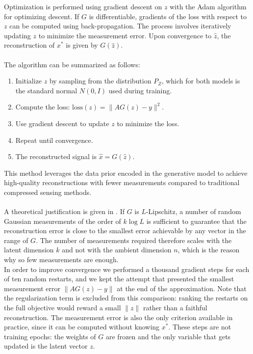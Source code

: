 Optimization is performed using gradient descent on \( z \) with the Adam algorithm \cite{kingma2015adam} for optimizing descent. If \( G \) is differentiable, gradients of the loss with respect to \( z \) can be computed using back-propagation. The process involves iteratively updating \( z \) to minimize the measurement error. Upon convergence to \( \hat{z} \), the reconstruction of \( x^* \) is given by \( G(\hat{z}) \).
\\\\
The algorithm can be summarized as follows:
\begin{enumerate}
    \item Initialize \( z \) by sampling from the distribution \( P_Z \), which for both models is the standard normal \( N(0, I) \) used during training.
    \item Compute the loss: \( \text{loss}(z) = \| AG(z) - y \|^2 \).
    \item Use gradient descent to update \( z \) to minimize the loss.
    \item Repeat until convergence.
    \item The reconstructed signal is \( \hat{x} = G(\hat{z}) \).
\end{enumerate}
This method leverages the data prior encoded in the generative model to achieve high-quality reconstructions with fewer measurements compared to traditional compressed sensing methods.
\\\\
A theoretical justification is given in \cite{bora2017}. If \( G \) is \( L \)-Lipschitz, a number of random Gaussian measurements of the order of \( k \log L \) is sufficient to guarantee that the reconstruction error is close to the smallest error achievable by any vector in the range of \( G \). The number of measurements required therefore scales with the latent dimension \( k \) and not with the ambient dimension \( n \), which is the reason why so few measurements are enough.
\\
In order to improve convergence we performed a thousand gradient steps for each of ten random restarts, and we kept the attempt that presented the smallest measurement error \( \| AG(z) - y \| \) at the end of the approximation. Note that the regularization term is excluded from this comparison: ranking the restarts on the full objective would reward a small \( \|z\| \) rather than a faithful reconstruction. The measurement error is also the only criterion available in practice, since it can be computed without knowing \( x^* \). These steps are not training epochs: the weights of \( G \) are frozen and the only variable that gets updated is the latent vector \( z \).

